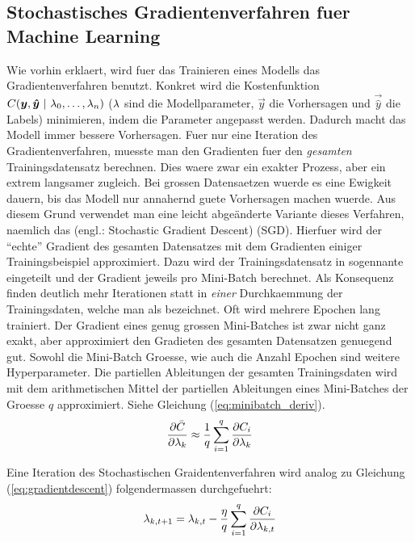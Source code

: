 \subsection{Stochastisches Gradientenverfahren fuer Machine Learning}
Wie vorhin erklaert, wird fuer das Trainieren eines Modells das Gradientenverfahren benutzt.
Konkret wird die Kostenfunktion $C(\vec{y},\vec{\hat{y}}\ |\ \param_0,\ldots,\param_n)$
($\lambda$ sind die Modellparameter, $\vec{y}$ die Vorhersagen und $\vec{\hat{y}}$
die Labels) minimieren, indem die Parameter angepasst werden. Dadurch macht das Modell immer bessere Vorhersagen.
Fuer nur eine Iteration des Gradientenverfahren, muesste man den Gradienten fuer den
\textit{gesamten} Trainingsdatensatz berechnen.
Dies waere zwar ein exakter Prozess, aber ein extrem langsamer zugleich.
Bei grossen Datensaetzen wuerde es eine Ewigkeit dauern, bis das Modell nur annahernd guete Vorhersagen machen wuerde.
\para{}
Aus diesem Grund verwendet man eine leicht abgeänderte Variante dieses
Verfahren, naemlich das  (engl.:
Stochastic Gradient Descent) (SGD).
Hierfuer wird der ``echte'' Gradient des gesamten Datensatzes mit dem Gradienten einiger Trainingsbeispiel approximiert.
Dazu wird der Trainingsdatensatz in sogennante  eingeteilt und der Gradient jeweils pro Mini-Batch berechnet.
Als Konsequenz finden deutlich mehr Iterationen statt in \textit{einer}
Durchkaemmung der Trainingsdaten, welche man als  bezeichnet. Oft wird mehrere Epochen lang trainiert.
Der Gradient eines genug grossen Mini-Batches ist zwar nicht ganz exakt, aber approximiert den Gradieten des gesamten Datensatzen genuegend gut.
Sowohl die Mini-Batch Groesse, wie auch die Anzahl Epochen sind weitere Hyperparameter.
\para{}
Die partiellen Ableitungen der gesamten Trainingsdaten wird mit dem arithmetischen Mittel der partiellen Ableitungen eines Mini-Batches der Groesse $q$ approximiert. Siehe Gleichung (\ref{eq:minibatch_deriv}).
\begin{equation}\label{eq:minibatch_deriv}
  \frac{\partial \bar{C}}{\partial \lambda_k} \approx \frac{1}{q}\sum_{i=1}^{q} \frac{\partial C_i}{\partial \lambda_k}
\end{equation}

Eine Iteration des Stochastischen Graidentenverfahren wird analog zu Gleichung (\ref{eq:gradientdescent}) folgendermassen durchgefuehrt:
\begin{equation}\label{eq:sgd}
  \lambda_{k,t+1} = \lambda_{k,t} - \frac{\eta}{q} \sum_{i=1}^{q} \frac{\partial C_i}{\partial \lambda_{k,t}}
\end{equation}


